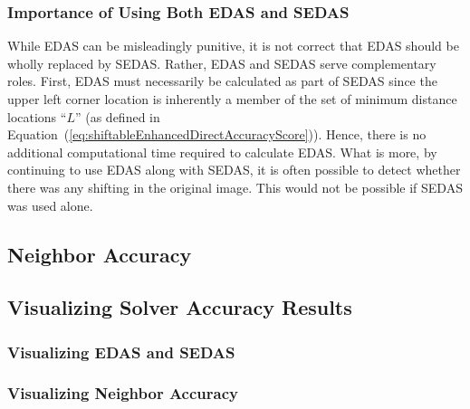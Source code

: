 \documentclass{report}
\def\eref#1{(\ref{#1})}
\begin{document}
\subsubsection{Importance of Using Both EDAS and SEDAS}\label{sec:importanceEdasSedas}

While EDAS can be misleadingly punitive, it is not correct that EDAS should be wholly replaced by SEDAS.  Rather, EDAS and SEDAS serve complementary roles.  First, EDAS must necessarily be calculated as part of SEDAS since the upper left corner location is inherently a member of the set of minimum distance locations ``$L$'' (as defined in Equation~\eref{eq:shiftableEnhancedDirectAccuracyScore}).  Hence, there is no additional computational time required to calculate EDAS.  What is more, by continuing to use EDAS along with SEDAS, it is often possible to detect whether there was any shifting in the original image.  This would not be possible if SEDAS was used alone.

\subsection{Neighbor Accuracy}\label{sec:neighborAccuracy}

\subsection{Visualizing Solver Accuracy Results}\label{sec:visualizingSolverAccuracy}

\subsubsection{Visualizing EDAS and SEDAS}\label{sec:visualizingEdasSedas}

\subsubsection{Visualizing Neighbor Accuracy}\label{sec:visualizingNeighborAccuracy}

\pagebreak


\end{document}
